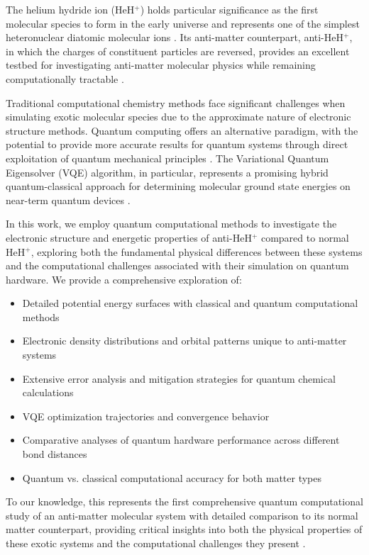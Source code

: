 \documentclass[10pt,twocolumn,a4paper]{article}
\begin{document}
The helium hydride ion (HeH$^+$) holds particular significance as the first molecular species to form in the early universe and represents one of the simplest heteronuclear diatomic molecular ions \cite{lee2019first}. Its anti-matter counterpart, anti-HeH$^+$, in which the charges of constituent particles are reversed, provides an excellent testbed for investigating anti-matter molecular physics while remaining computationally tractable \cite{czachorowski2020towards}.

Traditional computational chemistry methods face significant challenges when simulating exotic molecular species due to the approximate nature of electronic structure methods. Quantum computing offers an alternative paradigm, with the potential to provide more accurate results for quantum systems through direct exploitation of quantum mechanical principles \cite{cao2019quantum}. The Variational Quantum Eigensolver (VQE) algorithm, in particular, represents a promising hybrid quantum-classical approach for determining molecular ground state energies on near-term quantum devices \cite{peruzzo2014variational, mcclean2016theory}.

In this work, we employ quantum computational methods to investigate the electronic structure and energetic properties of anti-HeH$^+$ compared to normal HeH$^+$, exploring both the fundamental physical differences between these systems and the computational challenges associated with their simulation on quantum hardware. We provide a comprehensive exploration of:

\begin{itemize}
\item Detailed potential energy surfaces with classical and quantum computational methods
\item Electronic density distributions and orbital patterns unique to anti-matter systems
\item Extensive error analysis and mitigation strategies for quantum chemical calculations
\item VQE optimization trajectories and convergence behavior
\item Comparative analyses of quantum hardware performance across different bond distances
\item Quantum vs. classical computational accuracy for both matter types
\end{itemize}

To our knowledge, this represents the first comprehensive quantum computational study of an anti-matter molecular system with detailed comparison to its normal matter counterpart, providing critical insights into both the physical properties of these exotic systems and the computational challenges they present \cite{cerezo2021variational}.
\end{document}
